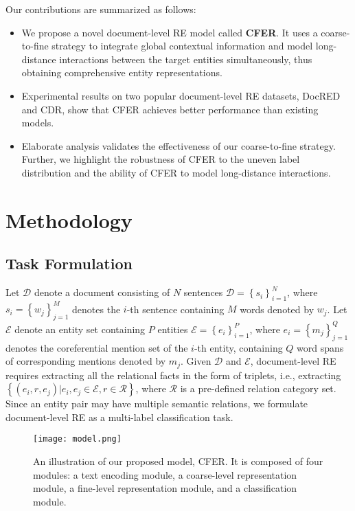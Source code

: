 \documentclass{article}
\begin{document}
Our contributions are summarized as follows: 
\begin{itemize}
    \item 
    We propose a novel document-level RE model called \textbf{CFER}. 
    It uses a coarse-to-fine strategy to integrate global contextual information and model long-distance interactions between the target entities simultaneously, thus obtaining comprehensive entity representations. 
    
    \item 
    Experimental results on two popular document-level RE datasets, DocRED and CDR, show that CFER achieves better performance than existing models. 
    
    \item 
    Elaborate analysis validates the effectiveness of our coarse-to-fine strategy. 
    Further, we highlight the robustness of CFER to the uneven label distribution and the ability of CFER to model long-distance interactions. 
\end{itemize}

\section{Methodology}

\subsection{Task Formulation}

Let $\mathcal{D}$ denote a document consisting of $N$ sentences $\mathcal{D}=\left\{s_i\right\}^{N}_{i=1}$, 
where $s_i=\left\{w_j\right\}^{M}_{j=1}$ denotes the $i$-th sentence containing $M$ words denoted by $w_j$. 
Let $\mathcal{E}$ denote an entity set containing $P$ entities $\mathcal{E}=\left\{e_i\right\}^{P}_{i=1}$, where $e_i=\left\{m_j\right\}^{Q}_{j=1}$ denotes the coreferential mention set of the $i$-th entity, containing $Q$ word spans of corresponding mentions denoted by $m_j$. 
Given $\mathcal{D}$ and $\mathcal{E}$, document-level RE requires extracting all the relational facts in the form of triplets, i.e., extracting $\left\{(e_i, r, e_j) | e_i, e_j \in \mathcal{E}, r \in \mathcal{R} \right\}$, where $\mathcal{R}$ is a pre-defined relation category set. 
Since an entity pair may have multiple semantic relations, we formulate document-level RE as a multi-label classification task. 

\begin{figure*}[t]
\centering
\texttt{[image: model.png]}
\caption{
An illustration of our proposed model, CFER. 
It is composed of four modules: a text encoding module, a coarse-level representation module, a fine-level representation module, and a classification module. 
}
\label{fig:model}
\end{figure*}
\end{document}
